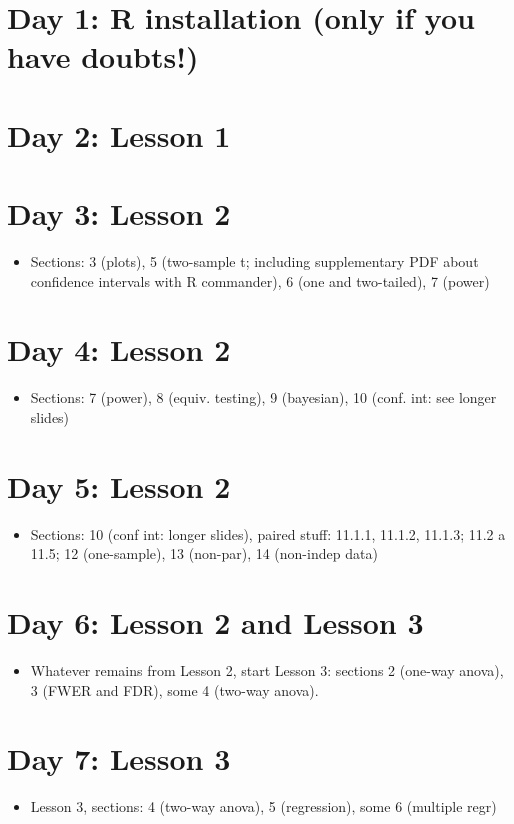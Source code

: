 \documentclass[11pt]{article}
\author{Ramon Diaz-Uriarte}
\date{\today}
\title{}
\begin{document}
\section*{Day 1: R installation (only if you have doubts!)}
\label{sec:org9e12bf6}

\section*{Day 2: Lesson 1}
\label{sec:org3488f5d}

\section*{Day 3: Lesson 2}
\label{sec:org21b08e0}
\begin{itemize}
\item Sections: 3 (plots), 5 (two-sample t; including supplementary PDF about confidence intervals with R commander), 6 (one and two-tailed), 7 (power)
\end{itemize}
\section*{Day 4: Lesson 2}
\label{sec:org5a4c730}
\begin{itemize}
\item Sections: 7 (power), 8 (equiv. testing), 9 (bayesian), 10 (conf. int: see longer slides)
\end{itemize}
\section*{Day 5: Lesson 2}
\label{sec:org609aabb}
\begin{itemize}
\item Sections: 10 (conf int: longer slides), paired stuff: 11.1.1, 11.1.2, 11.1.3; 11.2 a 11.5;  12 (one-sample), 13 (non-par), 14 (non-indep data)
\end{itemize}
\section*{Day 6: Lesson 2 and Lesson 3}
\label{sec:org394fbf9}
\begin{itemize}
\item Whatever remains from Lesson 2, start Lesson 3: sections 2 (one-way anova), 3 (FWER and FDR), some 4 (two-way anova).
\end{itemize}
\section*{Day 7: Lesson 3}
\label{sec:orgcb0a12f}
\begin{itemize}
\item Lesson 3, sections: 4 (two-way anova), 5 (regression), some 6 (multiple regr)
\end{itemize}
\end{document}
